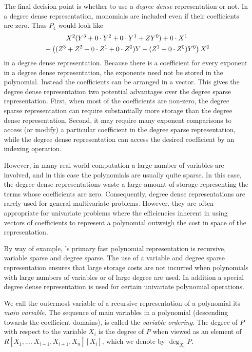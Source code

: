 The final decision point is whether to use a {\em degree dense}
representation or not. In a
degree dense representation, monomials are included even if their
coefficients are zero.  Thus $P_{4}$ would look like
\begin{multline}
   X^{2}  (Y^{3} + 0 \cdot Y^{2} + 0 \cdot Y^{1} + Z Y^{0}) 
      + 0 \cdot X^{1}\\
  \hfill{}+ \left((Z^{3} + Z^{2} + 0 \cdot Z^{1} + 0 \cdot Z^{0}) Y
    + (Z^{1} + 0 \cdot Z^{0}) Y^{0}\right) X^{0}
\end{multline}
in a degree dense representation.  Because there is a coefficient for
every exponent in a degree dense representation, the exponents need
not be stored in the polynomial.  Instead the coefficients can be
arranged in a vector.  This gives the degree dense representation two
potential advantages over the degree sparse representation.  First,
when most of the coefficients are non-zero, the degree sparse
representation can require substantially more storage than the degree
dense representation.  Second, it may require many exponent
comparisons to access (or modify) a particular coefficient in the
degree sparse representation, while the degree dense representation
can access the desired coefficient by an indexing operation.  

However, in many real world computation a large number of variables
are involved, and in this case the polynomials are usually quite
sparse.  In this case, the degree dense representations waste a large
amount of storage representing the terms whose coefficients are
zero.  Consequently, degree dense representations are rarely used for
general multivariate problems.  However, they are often appropriate
for univariate problems where the efficiencies inherent in using
vectors of coefficients to represent a polynomial outweigh the cost in
space of the representation.

By way of example, \Macsyma's primary fast polynomial representation
is recursive, variable sparse and degree sparse.  The use of a
variable and degree sparse representation ensures that large storage
costs are not incurred when polynomials with large numbers of
variables or of large degree are used.  In addition a special degree
dense representation is used for certain univariate polynomial
operations.

 
We call the outermost variable of a recursive representation of a
polynomial its {\em main variable\/}.  The sequence of main variables
in a polynomial (descending towards the coefficient domains), is called
the {\em variable ordering\/}.  The degree of $P$ with respect to the
variable $X_{i}$ is the degree of $P$ when viewed as an element of
$R[X_1, \ldots,X_{i-1}, X_{i+1}, X_n][X_i]$, which we denote by
$\deg_{X_{i}} P$.

